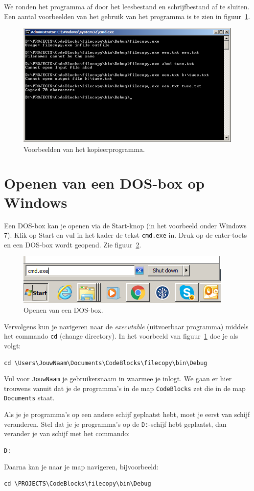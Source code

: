 \documentclass[a4paper,12pt,twoside]{article}
\begin{document}
We ronden het programma af door het leesbestand en schrijfbestand af te sluiten. Een
aantal voorbeelden van het gebruik van het programma is te zien in figuur~\ref{fig:filecopy}.

\begin{figure}[!ht]
\centering
\includegraphics[width=\textwidth]{filecopy.png}
\caption{Voorbeelden van het kopieerprogramma.}
\label{fig:filecopy}
\end{figure}

\section{Openen van een DOS-box op Windows}
Een DOS-box kan je openen via de Start-knop (in het voorbeeld onder Windows 7).
Klik op Start en vul in het kader de tekst \lstinline|cmd.exe| in. Druk op de
enter-toets en een DOS-box wordt geopend. Zie figuur~\ref{fig:cmdexe}.

\begin{figure}[!ht]
\centering
\includegraphics[scale=0.63]{cmdexe.png}
\caption{Openen van een DOS-box.}
\label{fig:cmdexe}
\end{figure}

Vervolgens kun je navigeren naar de \textsl{executable} (uitvoerbaar programma)
middels het commando \lstinline|cd| (change directory). In het voorbeeld van
figuur~\ref{fig:filecopy} doe je als volgt:

\lstinline|cd \Users\JouwNaam\Documents\CodeBlocks\filecopy\bin\Debug|

Vul voor \lstinline|JouwNaam| je gebruikersnaam in waarmee je inlogt. We gaan er hier
trouwens vanuit dat je de programma's in de map \lstinline|CodeBlocks| zet die in de map
\lstinline|Documents| staat.

Als je je programma's op een andere schijf geplaatst hebt, moet je eerst van schijf veranderen.
Stel dat je je programma's op de \lstinline|D:|-schijf hebt geplaatst, dan verander je van
schijf met het commando:

\lstinline|D:|

Daarna kan je naar je map navigeren, bijvoorbeeld:

\lstinline|cd \PROJECTS\CodeBlocks\filecopy\bin\Debug|
\end{document}
